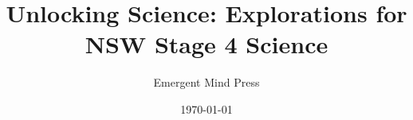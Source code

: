 \documentclass[justified,notoc]{tufte-book}
\title{Unlocking Science: Explorations for NSW Stage 4 Science}
\author{Emergent Mind Press}
\date{\today}
\begin{document}
\maketitle

\tableofcontents


\FloatBarrier %


\FloatBarrier %


\FloatBarrier %


\FloatBarrier %

% 
% 
% 
% 
% 
% 
% 
% 
% 
% 
% 
% 
% 
\end{document}
